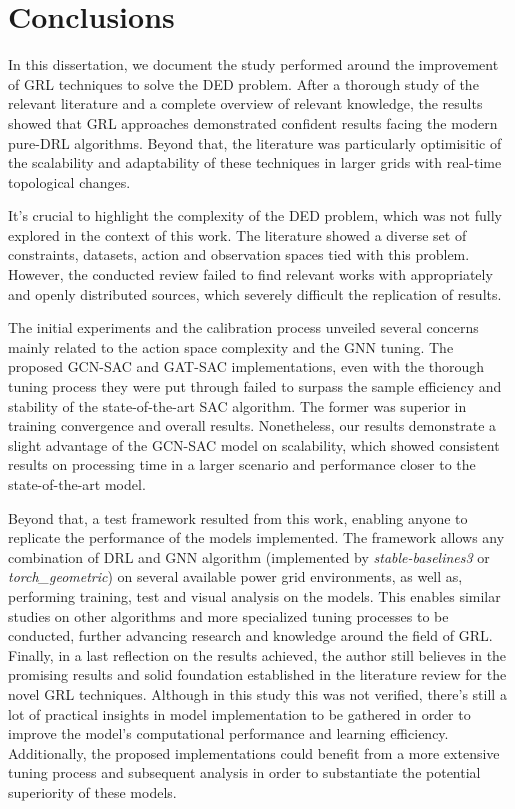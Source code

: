 \chapter{Conclusions} \label{chap:conclusion}


In this dissertation, we document the study performed around the improvement of \ac{GRL} techniques to solve the \ac{DED} problem. After a thorough study of the relevant literature and a complete overview of relevant knowledge, the results showed that \ac{GRL} approaches demonstrated confident results facing the modern pure-\ac{DRL} algorithms. Beyond that, the literature was particularly optimisitic of the scalability and adaptability of these techniques in larger grids with real-time topological changes. \par
It's crucial to highlight the complexity of the \ac{DED} problem, which was not fully explored in the context of this work. The literature showed a diverse set of constraints, datasets, action and observation spaces tied with this problem. However, the conducted review failed to find relevant works with appropriately and openly distributed sources, which severely difficult the replication of results. \par
The initial experiments and the calibration process unveiled several concerns mainly related to the action space complexity and the \ac{GNN} tuning. The proposed GCN-SAC and GAT-SAC implementations, even with the thorough tuning process they were put through failed to surpass the sample efficiency and stability of the state-of-the-art \ac{SAC} algorithm. The former was superior in training convergence and overall results. Nonetheless, our results demonstrate a slight advantage of the GCN-SAC model on scalability, which showed consistent results on processing time in a larger scenario and performance closer to the state-of-the-art model. \par
Beyond that, a test framework resulted from this work, enabling anyone to replicate the performance of the models implemented. The framework allows any combination of \ac{DRL} and \ac{GNN} algorithm (implemented by \textit{stable-baselines3} or \textit{torch\_geometric}) on several available power grid environments, as well as, performing training, test and visual analysis on the models. This enables similar studies on other algorithms and more specialized tuning processes to be conducted, further advancing research and knowledge around the field of \ac{GRL}.
Finally, in a last reflection on the results achieved, the author still believes in the promising results and solid foundation established in the literature review for the novel \ac{GRL} techniques. Although in this study this was not verified, there's still a lot of practical insights in model implementation to be gathered in order to improve the model's computational performance and learning efficiency. Additionally, the proposed implementations could benefit from a more extensive tuning process and subsequent analysis in order to substantiate the potential superiority of these models.



